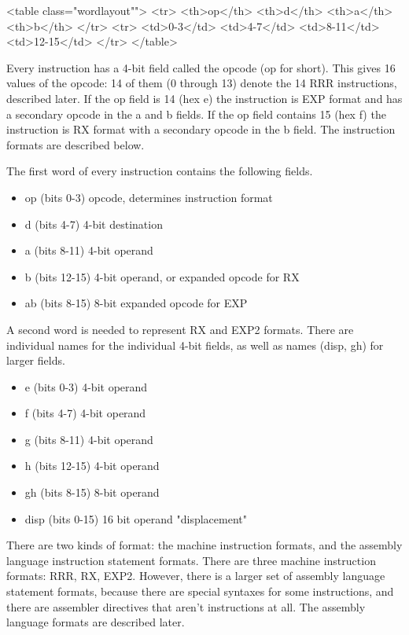 \documentclass[11pt]{article}
\begin{document}
<table class="wordlayout"">
 <tr>
  <th>op</th>
  <th>d</th>
  <th>a</th>
  <th>b</th>
 </tr>
 <tr>
  <td>0-3</td>
  <td>4-7</td>
  <td>8-11</td>
  <td>12-15</td>
 </tr>
</table>

Every instruction has a 4-bit field called the opcode (op for short).
This gives 16 values of the opcode: 14 of them (0 through 13) denote
the 14 RRR instructions, described later.  If the op field is 14 (hex
e) the instruction is EXP format and has a secondary opcode in the a
and b fields.  If the op field contains 15 (hex f) the instruction is
RX format with a secondary opcode in the b field.  The instruction
formats are described below.

The first word of every instruction contains the
following fields.

\begin{itemize}
\item op  (bits 0-3) opcode, determines instruction format
\item d   (bits 4-7) 4-bit destination
\item a   (bits 8-11) 4-bit operand
\item b   (bits 12-15) 4-bit operand, or expanded opcode for RX
\item ab  (bits 8-15)  8-bit expanded opcode for EXP
\end{itemize}

A second word is needed to represent RX and EXP2 formats.  There
are individual names for the individual 4-bit fields, as well as names
(disp, gh) for larger fields.

\begin{itemize}
\item e (bits 0-3) 4-bit operand
\item f (bits 4-7) 4-bit operand
\item g (bits 8-11) 4-bit operand
\item h (bits 12-15) 4-bit operand
\item gh (bits 8-15) 8-bit operand
\item disp (bits 0-15) 16 bit operand "displacement"
\end{itemize}

There are two kinds of format: the machine instruction formats, and
the assembly language instruction statement formats.  There are three
machine instruction formats: RRR, RX, EXP2.  However, there is a
larger set of assembly language statement formats, because there are
special syntaxes for some instructions, and there are assembler
directives that aren't instructions at all.  The assembly language
formats are described later.
\end{document}
